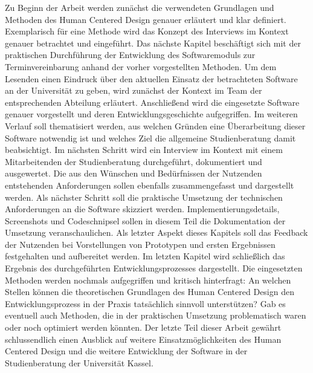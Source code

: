 \documentclass[12pt]{article}
\begin{document}
Zu Beginn der Arbeit werden zunächst die verwendeten Grundlagen und Methoden
des Human Centered Design genauer erläutert und klar definiert. Exemplarisch
für eine Methode wird das Konzept des Interviews im Kontext genauer betrachtet
und eingeführt. Das nächste Kapitel beschäftigt sich mit der praktischen
Durchführung der Entwicklung des Softwaremoduls zur Terminvereinbarung anhand
der vorher vorgestellten Methoden. Um dem Lesenden einen Eindruck über den
aktuellen Einsatz der betrachteten Software an der Universität zu geben, wird
zunächst der Kontext im Team der entsprechenden Abteilung erläutert.
Anschließend wird die eingesetzte Software genauer vorgestellt und deren
Entwicklungsgeschichte aufgegriffen. Im weiteren Verlauf soll thematisiert
werden, aus welchen Gründen eine Überarbeitung dieser Software notwendig ist
und welches Ziel die allgemeine Studienberatung damit beabsichtigt. Im nächsten
Schritt wird ein Interview im Kontext mit einem Mitarbeitenden der
Studienberatung durchgeführt, dokumentiert und ausgewertet. Die aus den
Wünschen und Bedürfnissen der Nutzenden entstehenden Anforderungen sollen
ebenfalls zusammengefasst und dargestellt werden. Als nächster Schritt soll die
praktische Umsetzung der technischen Anforderungen an die Software skizziert
werden. Implementierungsdetails, Screenshots und Codeschnipsel sollen in diesem
Teil die Dokumentation der Umsetzung veranschaulichen. Als letzter Aspekt
dieses Kapitels soll das Feedback der Nutzenden bei Vorstellungen von
Prototypen und ersten Ergebnissen festgehalten und aufbereitet werden. Im
letzten Kapitel wird schließlich das Ergebnis des durchgeführten
Entwicklungsprozesses dargestellt. Die eingesetzten Methoden werden nochmals
aufgegriffen und kritisch hinterfragt: An welchen Stellen können die
theoretischen Grundlagen des Human Centered Design den Entwicklungsprozess in
der Praxis tatsächlich sinnvoll unterstützen? Gab es eventuell auch Methoden,
die in der praktischen Umsetzung problematisch waren oder noch optimiert werden
könnten. Der letzte Teil dieser Arbeit gewährt schlussendlich einen Ausblick
auf weitere Einsatzmöglichkeiten des Human Centered Design und die weitere
Entwicklung der Software in der Studienberatung der Universität Kassel.

\end{document}
